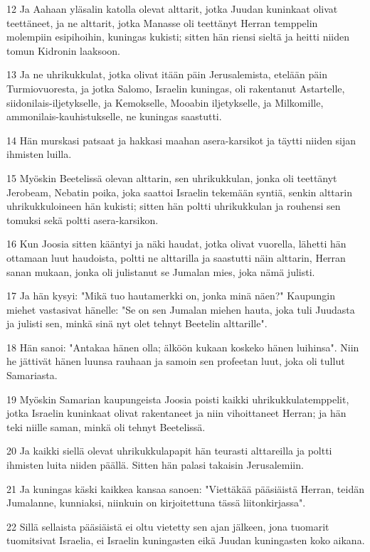 \par 12 Ja Aahaan yläsalin katolla olevat alttarit, jotka Juudan kuninkaat olivat teettäneet, ja ne alttarit, jotka Manasse oli teettänyt Herran temppelin molempiin esipihoihin, kuningas kukisti; sitten hän riensi sieltä ja heitti niiden tomun Kidronin laaksoon.
\par 13 Ja ne uhrikukkulat, jotka olivat itään päin Jerusalemista, etelään päin Turmiovuoresta, ja jotka Salomo, Israelin kuningas, oli rakentanut Astartelle, siidonilais-iljetykselle, ja Kemokselle, Mooabin iljetykselle, ja Milkomille, ammonilais-kauhistukselle, ne kuningas saastutti.
\par 14 Hän murskasi patsaat ja hakkasi maahan asera-karsikot ja täytti niiden sijan ihmisten luilla.
\par 15 Myöskin Beetelissä olevan alttarin, sen uhrikukkulan, jonka oli teettänyt Jerobeam, Nebatin poika, joka saattoi Israelin tekemään syntiä, senkin alttarin uhrikukkuloineen hän kukisti; sitten hän poltti uhrikukkulan ja rouhensi sen tomuksi sekä poltti asera-karsikon.
\par 16 Kun Joosia sitten kääntyi ja näki haudat, jotka olivat vuorella, lähetti hän ottamaan luut haudoista, poltti ne alttarilla ja saastutti näin alttarin, Herran sanan mukaan, jonka oli julistanut se Jumalan mies, joka nämä julisti.
\par 17 Ja hän kysyi: "Mikä tuo hautamerkki on, jonka minä näen?" Kaupungin miehet vastasivat hänelle: "Se on sen Jumalan miehen hauta, joka tuli Juudasta ja julisti sen, minkä sinä nyt olet tehnyt Beetelin alttarille".
\par 18 Hän sanoi: "Antakaa hänen olla; älköön kukaan koskeko hänen luihinsa". Niin he jättivät hänen luunsa rauhaan ja samoin sen profeetan luut, joka oli tullut Samariasta.
\par 19 Myöskin Samarian kaupungeista Joosia poisti kaikki uhrikukkulatemppelit, jotka Israelin kuninkaat olivat rakentaneet ja niin vihoittaneet Herran; ja hän teki niille saman, minkä oli tehnyt Beetelissä.
\par 20 Ja kaikki siellä olevat uhrikukkulapapit hän teurasti alttareilla ja poltti ihmisten luita niiden päällä. Sitten hän palasi takaisin Jerusalemiin.
\par 21 Ja kuningas käski kaikkea kansaa sanoen: "Viettäkää pääsiäistä Herran, teidän Jumalanne, kunniaksi, niinkuin on kirjoitettuna tässä liitonkirjassa".
\par 22 Sillä sellaista pääsiäistä ei oltu vietetty sen ajan jälkeen, jona tuomarit tuomitsivat Israelia, ei Israelin kuningasten eikä Juudan kuningasten koko aikana.

